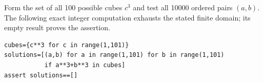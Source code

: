 Form the set of all 100 possible cubes $c^3$ and test all 10000 ordered pairs $(a,b)$. The following exact integer computation exhausts the stated finite domain; its empty result proves the assertion.
\begin{verbatim}
cubes={c**3 for c in range(1,101)}
solutions=[(a,b) for a in range(1,101) for b in range(1,101)
           if a**3+b**3 in cubes]
assert solutions==[]
\end{verbatim}
